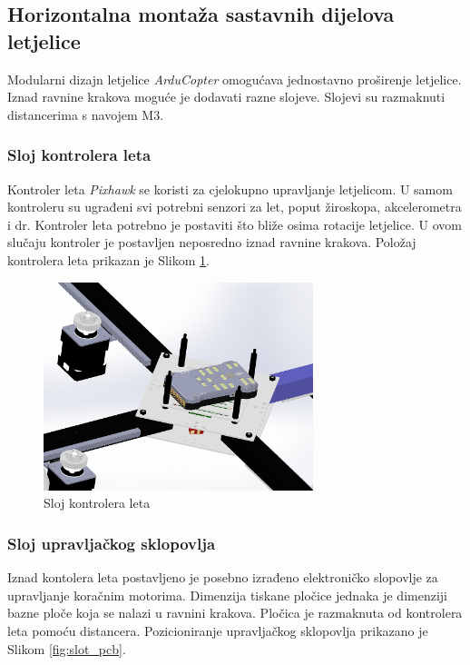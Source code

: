 \documentclass[11pt,a4paper]{article}
\begin{document}
\subsection{Horizontalna montaža sastavnih dijelova letjelice}
Modularni dizajn letjelice \textit{ArduCopter} omogućava jednostavno proširenje letjelice. Iznad ravnine krakova moguće je dodavati razne slojeve. Slojevi su razmaknuti distancerima s navojem M3. 

\subsubsection{Sloj kontrolera leta}

Kontroler leta \textit{Pixhawk} se koristi za cjelokupno upravljanje letjelicom. U samom kontroleru su ugrađeni svi potrebni senzori za let, poput žiroskopa, akcelerometra i dr. Kontroler leta potrebno je postaviti što bliže osima rotacije letjelice. U ovom slučaju kontroler je postavljen neposredno iznad ravnine krakova. Položaj kontrolera leta prikazan je Slikom \ref{fig:slot_pixhawk}.

\begin{figure}[H]
	\centering
	\includegraphics[width=0.7\textwidth]{figures/arducopter_slot_pixhawk.png}
	\caption{Sloj kontrolera leta}
	\label{fig:slot_pixhawk}
\end{figure}


\subsubsection{Sloj upravljačkog sklopovlja}

Iznad kontolera leta postavljeno je posebno izrađeno elektroničko slopovlje za upravljanje koračnim motorima. Dimenzija tiskane pločice jednaka je dimenziji bazne ploče koja se nalazi u ravnini krakova. Pločica je 
razmaknuta od kontrolera leta pomoću distancera. Pozicioniranje upravljačkog sklopovlja prikazano je Slikom \ref{fig:slot_pcb}.
\end{document}
